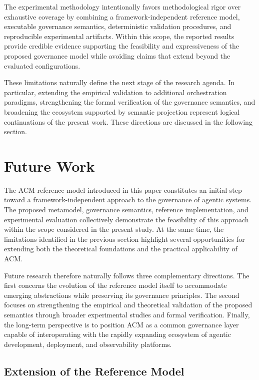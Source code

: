 \documentclass[10pt]{article}
\begin{document}
The experimental methodology intentionally favors methodological rigor over exhaustive coverage by combining a framework-independent reference model, executable governance semantics, deterministic validation procedures, and reproducible experimental artifacts. Within this scope, the reported results provide credible evidence supporting the feasibility and expressiveness of the proposed governance model while avoiding claims that extend beyond the evaluated configurations.

These limitations naturally define the next stage of the research agenda. In particular, extending the empirical validation to additional orchestration paradigms, strengthening the formal verification of the governance semantics, and broadening the ecosystem supported by semantic projection represent logical continuations of the present work. These directions are discussed in the following section.

\section{Future Work}
\label{sec:future_work}

The ACM reference model introduced in this paper constitutes an initial step toward a framework-independent approach to the governance of agentic systems. The proposed metamodel, governance semantics, reference implementation, and experimental evaluation collectively demonstrate the feasibility of this approach within the scope considered in the present study. At the same time, the limitations identified in the previous section highlight several opportunities for extending both the theoretical foundations and the practical applicability of ACM.

Future research therefore naturally follows three complementary directions. The first concerns the evolution of the reference model itself to accommodate emerging abstractions while preserving its governance principles. The second focuses on strengthening the empirical and theoretical validation of the proposed semantics through broader experimental studies and formal verification. Finally, the long-term perspective is to position ACM as a common governance layer capable of interoperating with the rapidly expanding ecosystem of agentic development, deployment, and observability platforms.

\subsection{Extension of the Reference Model}
\label{sec:future_reference_model}
\end{document}
